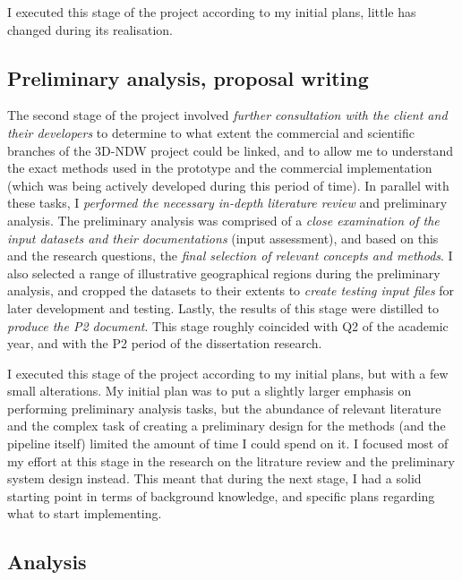 I executed this stage of the project according to my initial plans, little has changed during its realisation.

\subsection{Preliminary analysis, proposal writing}
\label{sub:preliminaryanalysis}

The second stage of the project involved \textit{further consultation with the client and their developers} to determine to what extent the commercial and scientific branches of the 3D-NDW project could be linked, and to allow me to understand the exact methods used in the prototype and the commercial implementation (which was being actively developed during this period of time). In parallel with these tasks, I \textit{performed the necessary in-depth literature review} and preliminary analysis. The preliminary analysis was comprised  of a \textit{close examination of the input datasets and their documentations} (input assessment), and based on this and the research questions, the \textit{final selection of relevant concepts and methods}. I also selected a range of illustrative geographical regions during the preliminary analysis, and cropped the datasets to their extents to \textit{create testing input files} for later development and testing. Lastly, the results of this stage were distilled to \textit{produce the P2 document}. This stage roughly coincided with Q2 of the academic year, and with the P2 period of the dissertation research.

I executed this stage of the project according to my initial plans, but with a few small alterations. My initial plan was to put a slightly larger emphasis on performing preliminary analysis tasks, but the abundance of relevant literature and the complex task of creating a preliminary design for the methods (and the pipeline itself) limited the amount of time I could spend on it. I focused most of my effort at this stage in the research on the litrature review and the preliminary system design instead. This meant that during the next stage, I had a solid starting point in terms of background knowledge, and specific plans regarding what to start implementing.

\subsection{Analysis}
\label{sub:analysis}

